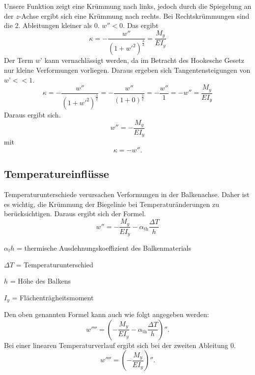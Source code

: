 Unsere Funktion zeigt eine Krümmung nach links, jedoch durch die Spiegelung an der $z$-Achse ergibt sich eine Krümmung nach rechts.
Bei Rechtskrümmungen sind die 2. Ableitungen kleiner als 0. $w'' < 0$.
Das ergibt
\begin{equation}
	\kappa=
	-\frac{w''}{\left(1+{w'}^2\right)^\frac{3}{2}}=
	\frac{M_y}{EI_y}
\end{equation}
Der Term $w’$ kann vernachlässigt werden, da im Betracht des Hookesche Gesetz nur kleine Verformungen vorliegen.
Daraus ergeben sich Tangentensteigungen von $w’ << 1$.
\begin{equation}
	\kappa=
	-\frac{w''}{\left(1+{w'}^2\right)^\frac{3}{2}}=
	-\frac{w''}{\left(1+0\right)^\frac{3}{2}}=
	-\frac{w''}{1}=-w''=
	\frac{M_y}{EI_y}
\end{equation}
Daraus ergibt sich.
\begin{equation}
	w''=
	-\frac{M_y}{EI_y}
\end{equation}
mit
\begin{equation}
	\kappa=
	-w''.
\end{equation}

\subsection{Temperatureinflüsse}
Temperaturunterschiede verursachen Verformungen in der Balkenachse.
Daher ist es wichtig, die Krümmung der Biegelinie bei Temperaturänderungen zu berücksichtigen.
Daraus ergibt sich der Formel.
\begin{equation}
	w''=
	-\frac{M_y}{EI_y}-\alpha_{\text{th}}\frac{\Delta T}{h}
\end{equation}

$α_th$ = thermische Ausdehnungskoeffizient des Balkenmaterials

$\Delta T$ = Temperaturunterschied

$h$ = Höhe des Balkens

$I_y$ = Flächenträgheitsmoment

Den oben genannten Formel kann auch wie folgt angegeben werden:
\begin{equation}
	w''''=
	\left(-\frac{M_y}{EI_y}-\alpha_{\text{th}}\frac{\Delta T}{h}\right)''.
\end{equation}
Bei einer linearen Temperaturverlauf ergibt sich bei der zweiten Ableitung 0.
\begin{equation}
	w''''=
	\left(-\frac{M_y}{EI_y}\right)''.
\end{equation}

